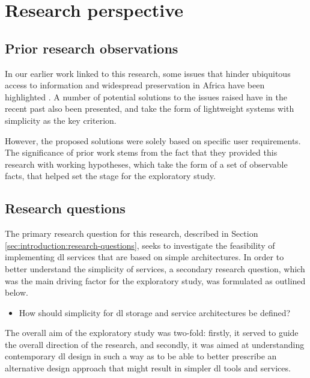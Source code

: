 \section{Research perspective}
\label{sec:exploratory-study:research-perspective}

\subsection{Prior research observations}
\label{sec:exploratory-study:research-perspective:prior-research-observations}

In our earlier work linked to this research, some issues that hinder
ubiquitous access to information and widespread preservation in Africa have
been highlighted \citep{Suleman2008}. A number of potential solutions to the
issues
raised have in the recent past also been presented, and take the form of
lightweight systems \citep{Suleman2007,Suleman2010a} with simplicity as
the key criterion.

However, the proposed solutions were solely based on specific user
requirements. The significance of prior work stems from the fact that they provided
this research with working hypotheses, which take the form of a set of
observable facts, that helped set the stage for the exploratory study.

\subsection{Research questions}
\label{sec:exploratory-study:research-perspective:research-questions}

The primary research question for this research, described in Section
\ref{sec:introduction:research-questions}, seeks to investigate the feasibility
of implementing \gls{dl} services that are based on simple
architectures. In order to better understand the simplicity of services, a
secondary research question, which was the main driving factor for the
exploratory study, was formulated as outlined below.

\begin{itemize}
 \item How should simplicity for \gls{dl} storage and service
architectures be defined?
\end{itemize}

The overall aim of the exploratory study was two-fold: firstly, it served to
guide the overall direction of the research, and secondly, it was aimed at
understanding contemporary \gls{dl} design in such a way as to be able to
better prescribe an alternative design approach that might result in simpler
\gls{dl} tools and services.

